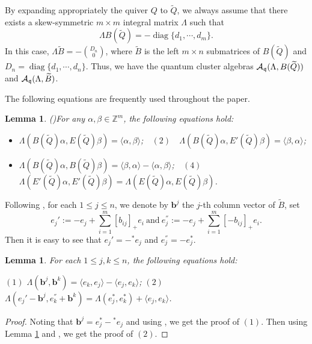 \documentclass[reqno,12pt]{amsart}
\numberwithin{equation}{section}
\def\lr#1{\langle #1\rangle} \def\fin{\hfill$\square$}  \def\lra{\longrightarrow} \def\mod{\mbox{\rm \textbf{mod}}\,}\def\Mod{\mbox{\rm mod}\,}\def\top{\mbox{\rm top}\,}\def\soc{\mbox{\rm soc}\,}
\theoremstyle{plain} %
\newtheorem{lemma}[theorem]{\bf Lemma}
\theoremstyle{definition} %
\begin{document}
By expanding appropriately the quiver $Q$ to $\widetilde{Q}$, we always assume that there exists a skew-symmetric $m\times m$ integral matrix $\Lambda$ such that \begin{equation*}\Lambda B(\widetilde{Q})=-\operatorname{diag}\{d_1,\cdots, d_m\}.\end{equation*}
In this case, $\Lambda\widetilde{B}=-{D_n\choose 0}$, where $\widetilde{B}$ is the left $m\times n$ submatrices of $B(\widetilde{Q})$ and $D_n=\operatorname{diag}\{d_1,\cdots, d_n\}$. Thus, we have the quantum cluster algebras ${\mathcal{A}}_{\mathfrak{q}}(\Lambda, B(\widetilde{Q}))$ and ${\mathcal{A}}_{\mathfrak{q}}(\Lambda, \widetilde{B})$.

The following equations are frequently used throughout the paper.
\begin{lemma}{\rm(\cite{FPZ})}\label{sjishu} For any $\alpha,\beta\in\mathbb{Z}^m$, the following equations hold:
\begin{itemize}
\item[$(1)$]$\Lambda(B(\widetilde{Q})\alpha,E(\widetilde{Q})\beta)=\lr{\alpha,\beta}$;~~$(2)$~~$\Lambda(B(\widetilde{Q})\alpha,E'(\widetilde{Q})\beta)=\lr{\beta,\alpha}$;
\item[$(3)$]$\Lambda(B(\widetilde{Q})\alpha,B(\widetilde{Q})\beta)=\lr{\beta,\alpha}-\lr{\alpha,\beta}$;~~$(4)$~~$\Lambda(E'(\widetilde{Q})\alpha,E'(\widetilde{Q})\beta)=\Lambda(E(\widetilde{Q})\alpha,E(\widetilde{Q})\beta)$.
\end{itemize}\end{lemma}

Following \cite[Proposition 7.1]{BZ05}, for each $1\leq j\leq n$, we denote by $\mathbf{b}^j$ the $j$-th column vector of $\widetilde{B}$, set
\begin{equation}\label{thjih}
e_j':=-e_j+\sum_{i=1}^m[b_{ij}]_+e_i~\text{and}~e_j^{''}:=-e_j+\sum_{i=1}^m[-b_{ij}]_+e_i.\end{equation}
Then it is easy to see that $e_j'=-{^\ast e}_j$ and $e_j^{''}=-e_j^\ast$.
\begin{lemma}\label{cor:exponent-relation}
For each $1\leq j,k\leq n$, the following equations hold:

$(1)$ $\Lambda(\mathbf{b}^j,\mathbf{b}^k)=\lr{e_k,e_j}-\lr{e_j,e_k}$;
$(2)$ $\Lambda(e_j'-\mathbf{b}^j,e_k^{''}+\mathbf{b}^k)=\Lambda(e_j^\ast, e_k^\ast)+\lr{e_j,e_k}$.
\end{lemma}
\begin{proof}
Noting that $\mathbf{b}^j=e_j^\ast-{^\ast e}_j$ and using \cite[Lemma 2.3(1)]{Rupel2}, we get the proof of $(1)$.
Then using Lemma \ref{sjishu} and \cite[Lemma 2.3(1)]{Rupel2}, we get the proof of $(2)$.
\end{proof}
\end{document}
